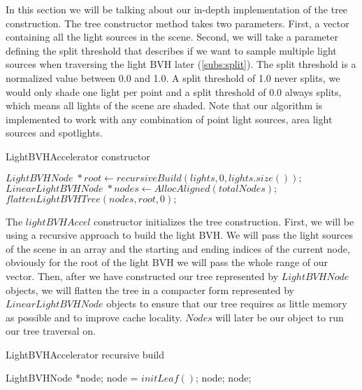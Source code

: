 In this section we will be talking about our in-depth implementation of the tree construction. The tree constructor method takes two parameters. First, a vector containing all the light sources in the scene. Second, we will take a parameter defining the split threshold that describes if we want to sample multiple light sources when traversing the light BVH later (\ref{subs:split}). The split threshold is a normalized value between 0.0 and 1.0. A split threshold of 1.0 never splits, we would only shade one light per point and a split threshold of 0.0 always splits, which means all lights of the scene are shaded. Note that our algorithm is implemented to work with any combination of point light sources, area light sources and spotlights.

\begin{algorithm}
	\caption{LightBVHAccelerator constructor}
	\label{LightBVHAccelerator}
	\begin{algorithmic}[1] %
		\State $LightBVHNode \; *root  \gets recursiveBuild(lights, 0, lights.size());$
		\State $LinearLightBVHNode \; *nodes \gets AllocAligned(totalNodes);$ 
		\State $flattenLightBVHTree(nodes, root, 0);$
		\EndProcedure
	\end{algorithmic}
\end{algorithm}

The $lightBVHAccel$ constructor initializes the tree construction. First, we will be using a recursive approach to build the light BVH. We will pass the light sources of the scene in an array and the starting and ending indices of the current node, obviously for the root of the light BVH we will pass the whole range of our vector. Then, after we have constructed our tree represented by $LightBVHNode$ objects, we will flatten the tree in a compacter form represented by $LinearLightBVHNode$ objects to ensure that our tree requires as little memory as possible and to improve cache locality. $Nodes$ will later be our object to run our tree traversal on.

\begin{algorithm}
	\caption{LightBVHAccelerator recursive build}
	\label{recursiveBuild}
	\begin{algorithmic}[1] %
		\State LightBVHNode *node;
			\State *node = $initLeaf()$;
			\State \Return node;
		\EndIf
        	\State <calculate axis and thetas for the whole node for current dimension>
			\State <calculate all split costs for current dimension>
		\EndFor
		\State <find out best split>
		\State <initialize child nodes and make reference as children>
		\State \Return node;
		\EndProcedure
	\end{algorithmic}
\end{algorithm}

